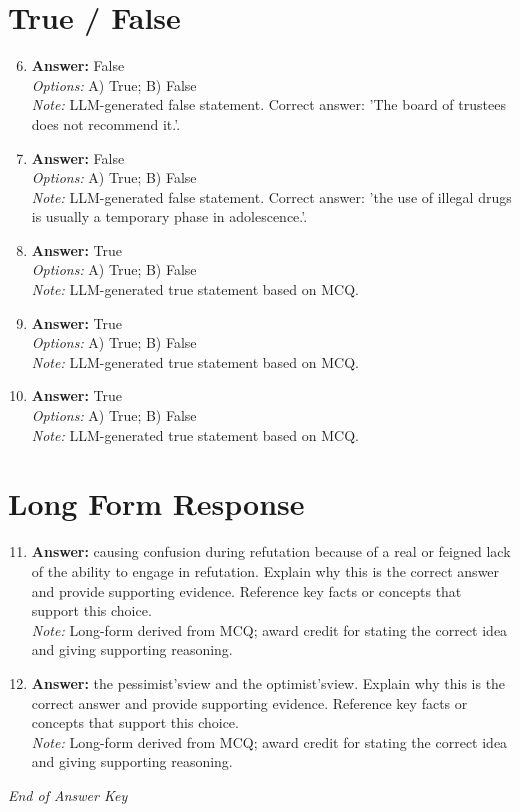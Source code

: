 \documentclass[12pt]{article}
\begin{document}
\section*{True / False}
\begin{enumerate}[label=\arabic*.]
\setcounter{enumi}{5}
\item \textbf{Answer:} False
\\ \textit{Options:} A) True; B) False
\\ \textit{Note:} LLM-generated false statement. Correct answer: 'The board of trustees does not recommend it.'.
\item \textbf{Answer:} False
\\ \textit{Options:} A) True; B) False
\\ \textit{Note:} LLM-generated false statement. Correct answer: 'the use of illegal drugs is usually a temporary phase in adolescence.'.
\item \textbf{Answer:} True
\\ \textit{Options:} A) True; B) False
\\ \textit{Note:} LLM-generated true statement based on MCQ.
\item \textbf{Answer:} True
\\ \textit{Options:} A) True; B) False
\\ \textit{Note:} LLM-generated true statement based on MCQ.
\item \textbf{Answer:} True
\\ \textit{Options:} A) True; B) False
\\ \textit{Note:} LLM-generated true statement based on MCQ.
\end{enumerate}

\section*{Long Form Response}
\begin{enumerate}[label=\arabic*.]
\setcounter{enumi}{10}
\item \textbf{Answer:} causing confusion during refutation because of a real or feigned lack of the ability to engage in refutation. Explain why this is the correct answer and provide supporting evidence. Reference key facts or concepts that support this choice.
\\ \textit{Note:} Long-form derived from MCQ; award credit for stating the correct idea and giving supporting reasoning.
\item \textbf{Answer:} the pessimist'sview and the optimist'sview. Explain why this is the correct answer and provide supporting evidence. Reference key facts or concepts that support this choice.
\\ \textit{Note:} Long-form derived from MCQ; award credit for stating the correct idea and giving supporting reasoning.
\end{enumerate}

\vfill
\noindent\textit{End of Answer Key}
\end{document}
